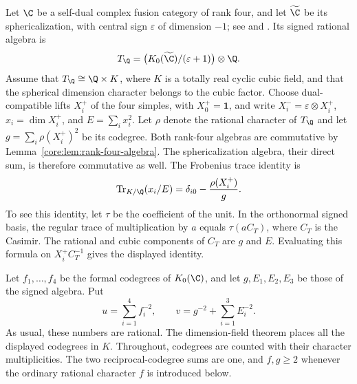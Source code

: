Let $\C$ be a self-dual complex fusion category of rank four,
and let $\widetilde{\C}$ be its sphericalization, with central
sign $\varepsilon$ of dimension $-1$; see \cite[Section~5.1]{Ostrik3} and
\cite[Section~5.3]{Bartlett}.  Its signed rational algebra is
\[
 T_{\Q}
 =\bigl(K_0(\widetilde{\C})/(\varepsilon+1)\bigr)
      \otimes\Q.
\]
Assume that $T_{\Q}\cong\Q\times K$, where $K$ is a
totally real cyclic cubic field, and that the spherical dimension
character belongs to the cubic factor.  Choose dual-compatible lifts
$X_i^+$ of the four simples, with $X_0^+=\mathbf1$, and write
$X_i^-=\varepsilon\otimes X_i^+$,
$x_i=\dim X_i^+$, and $E=\sum_i x_i^2$.  Let $\rho$ denote the
rational character of $T_{\Q}$ and let
$g=\sum_i\rho(X_i^+)^2$ be its codegree.  Both rank-four algebras are commutative by
Lemma~\ref{core:lem:rank-four-algebra}.  The sphericalization algebra, their direct sum, is
therefore commutative as well.  The Frobenius trace identity is
\begin{equation}\label{cub:eq:cubic-corrected-frobenius}
 \operatorname{Tr}_{K/\Q}(x_i/E)
       =\delta_{i0}-\frac{\rho(X_i^+)}g.
\end{equation}
To see this identity, let $\tau$ be the coefficient of the unit.
In the orthonormal signed basis, the regular trace of multiplication by
$a$ equals $\tau(a C_T)$, where $C_T$ is the Casimir.  The rational and
cubic components of $C_T$ are $g$ and $E$.  Evaluating this formula on
$X_i^+ C_T^{-1}$ gives the displayed identity.

Let $f_1,\ldots,f_4$ be the formal codegrees of $K_0(\C)$,
and let $g,E_1,E_2,E_3$ be those of the signed algebra.  Put
\[
 u=\sum_{i=1}^4f_i^{-2},\qquad
 v=g^{-2}+\sum_{i=1}^3 E_i^{-2}.
\]
As usual, these numbers are rational.  The dimension-field theorem
\cite[Corollary~2.15]{Ostrik3} places all the displayed codegrees in $K$.
Throughout, codegrees are counted with their character multiplicities.
The two reciprocal-codegree sums are one, and $f,g\ge2$ whenever the
ordinary rational character $f$ is introduced below.

